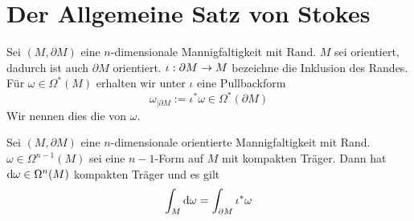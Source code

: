 \section{Der Allgemeine Satz von Stokes}
\Def{}
Sei $(M,\partial M)$ eine $n$-dimensionale Mannigfaltigkeit mit Rand. $M$ sei orientiert, dadurch ist auch $\partial M$ orientiert. $\iota : \partial M \overset{}{\rightarrow} M$ bezeichne die Inklusion des Randes.\\
Für $\omega \in \Omega^*(M)$ erhalten wir unter $\iota$ eine Pullbackform
\[ \omega_{|\partial M} := \iota^*\omega \in \Omega^*(\partial M) \]
Wir nennen dies die  von $\omega$.

Sei $(M,\partial M)$ eine $n$-dimensionale orientierte Mannigfaltigkeit mit Rand. $\omega \in \Omega^{n-1}(M)$ sei eine $n-1$-Form auf $M$ mit kompakten Träger. Dann hat $\text{d} \omega \in \Omega^n(M)$ kompakten Träger und es gilt
\[ \int_M \text{d} \omega = \int_{\partial M} \iota^*\omega \]
